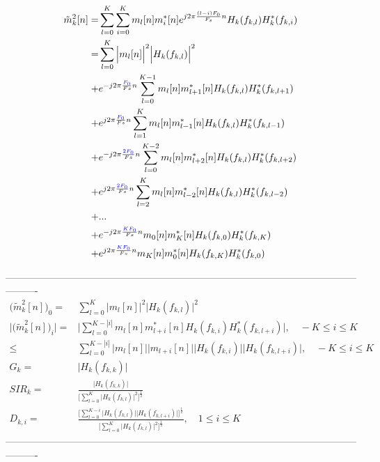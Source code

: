 \documentclass [11pt, proquest,oneside] {ganter_thesis}[2015/03/03]
\newcommand*{\mathcolor}{}
\def\mathcolor#1#{\mathcoloraux{#1}}
\newcommand*{\mathcoloraux}[3]{%
  \protect\leavevmode
  \begingroup
    \color#1{#2}#3%
  \endgroup
}
\begin{document}
\begin{align}
\tilde{m}_k^2[n] =& \sum\limits_{l=0}^K \sum\limits_{i=0}^K m_l[n] m_i^*[n] e^{j2\pi\frac{(l-i)F_0}{F_s}n} H_k(f_{k,l})H_k^*(f_{k,i}) \\
%
%
%
\label{eq:estimate_expanded}
=& \sum\limits_{l=0}^K \Big|m_l[n]\Big|^2 \Big|H_k(f_{k,l})\Big|^2 \nonumber \\
%
%
+& e^{-j2\pi \frac{\mathcolor{blue}{F_0}}{Fs}n} \sum\limits_{l=0}^{K-1} m_l[n] m_{l+1}^*[n] H_k(f_{k,l})H_k^*(f_{k,l+1}) \nonumber \\
%
+&  e^{j2\pi \frac{\mathcolor{blue}{F_0}}{Fs}n} \sum\limits_{l=1}^{K} m_l[n] m_{l-1}^*[n] H_k(f_{k,l})H_k^*(f_{k,l-1}) \nonumber \\
%
%
+& e^{-j2\pi \frac{\mathcolor{blue}{2F_0}}{Fs}n} \sum\limits_{l=0}^{K-2} m_l[n] m_{l+2}^*[n] H_k(f_{k,l})H_k^*(f_{k,l+2}) \nonumber \\
%
+& e^{j2\pi \frac{\mathcolor{blue}{2F_0}}{Fs}n}  \sum\limits_{l=2}^{K} m_l[n] m_{l-2}^*[n] H_k(f_{k,l})H_k^*(f_{k,l-2}) \nonumber \\
%
%
+& ... \nonumber \\
%
%
+& e^{-j2\pi \frac{\mathcolor{blue}{KF_0}}{Fs}n} m_0[n] m_K^*[n] H_k(f_{k,0})H_k^*(f_{k,K}) \nonumber \\
%
+& e^{j2\pi \frac{\mathcolor{blue}{KF_0}}{Fs}n}  m_K[n] m_0^*[n] H_k(f_{k,K})H_k^*(f_{k,0})
\end{align}

----------------------------------------------------------------------------------------------------------------------
\begin{align}
\Big( \tilde{m}^2_k[n]\Big)_0 =& \sum\limits_{l=0}^K \Big|m_l[n]\Big|^2 \Big|H_k(f_{k,l})\Big|^2 \nonumber \\
%
%
\Big| \Big( \tilde{m}^2_k[n]\Big)_i \Big| =& \Bigg| \sum\limits_{l=0}^{K-|i|} m_l[n] m^*_{l+i}[n] H_k(f_{k,i}) H^*_k(f_{k,l+i})\Bigg|, \quad -K \leq i \leq K \\
%
\leq& \sum\limits_{l=0}^{K-|i|} \Big| m_l[n]\Big| \Big|m_{l+i}[n]\Big| \Big|H_k(f_{k,i})\Big| \Big|H_k(f_{k,l+i})\Big|, \quad -K \leq i \leq K \\
%
%
%
%
%
%
G_k =& \Big| H_k(f_{k,k}) \Big| \\
%
SIR_k =& \frac{\Big| H_k(f_{k,k}) \Big|} {\Bigg[ \sum\limits_{l=0}^K \Big|H_k(f_{k,l})\Big|^2 \Bigg] ^ \frac{1}{2}} \\
%
%
D_{k,i} =& \frac{\Bigg[ \sum\limits_{l=0}^{K-i} \Big|H_k(f_{k,l})\Big| \Big|H_k(f_{k,l+i})\Big|\Bigg]^\frac{1}{2}}
{\Bigg[ \sum\limits_{l=0}^K \Big|H_k(f_{k,l})\Big|^2 \Bigg] ^ \frac{1}{2}}, \quad 1 \leq i \leq K
\end{align}
----------------------------------------------------------------------------------------------------------------------
\end{document}

